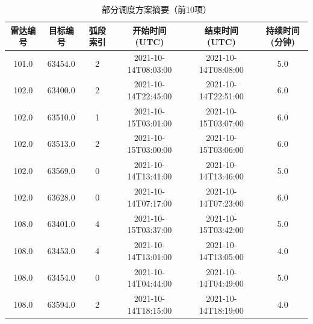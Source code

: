 \documentclass[openany,12pt,UTF8]{ctexart}
\begin{document}
\begin{table}
    \centering
    \caption{部分调度方案摘要（前10项）}
    \label{tab:schedule_summary}
    \begin{tabular}{|c|c|c|c|c|c|}
        \hline
        \textbf{雷达编号} & \textbf{目标编号} & \textbf{弧段索引} & \textbf{开始时间 (UTC)} & \textbf{结束时间 (UTC)} & \textbf{持续时间 (分钟)} \\
        \hline
        101.0         & 63454.0       & 2             & 2021-10-14T08:03:00 & 2021-10-14T08:08:00 & 5.0                \\
        \hline
        102.0         & 63400.0       & 2             & 2021-10-14T22:45:00 & 2021-10-14T22:51:00 & 6.0                \\
        \hline
        102.0         & 63510.0       & 1             & 2021-10-15T03:01:00 & 2021-10-15T03:07:00 & 6.0                \\
        \hline
        102.0         & 63513.0       & 2             & 2021-10-15T03:00:00 & 2021-10-15T03:06:00 & 6.0                \\
        \hline
        102.0         & 63569.0       & 0             & 2021-10-14T13:41:00 & 2021-10-14T13:46:00 & 5.0                \\
        \hline
        102.0         & 63628.0       & 0             & 2021-10-14T07:17:00 & 2021-10-14T07:23:00 & 6.0                \\
        \hline
        108.0         & 63401.0       & 4             & 2021-10-15T03:37:00 & 2021-10-15T03:42:00 & 5.0                \\
        \hline
        108.0         & 63453.0       & 4             & 2021-10-14T13:01:00 & 2021-10-14T13:05:00 & 4.0                \\
        \hline
        108.0         & 63454.0       & 0             & 2021-10-14T04:44:00 & 2021-10-14T04:49:00 & 5.0                \\
        \hline
        108.0         & 63594.0       & 2             & 2021-10-14T18:15:00 & 2021-10-14T18:19:00 & 4.0                \\
        \hline
    \end{tabular}
\end{table}
\end{document}
